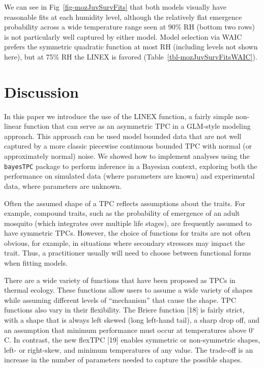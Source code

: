 \documentclass[
  11pt,
  letterpaper,
]{article}
\begin{document}
We can see in Fig~\ref{fig-mozJuvSurvFits} that both models visually
have reasonable fits at each humidity level, although the relatively
flat emergence probability across a wide temperature range seen at 90\%
RH (bottom two rows) is not particularly well captured by either model.
Model selection via WAIC prefers the symmetric quadratic function at
most RH (including levels not shown here), but at 75\% RH the LINEX is
favored (Table~\ref{tbl-mozJuvSurvFitsWAIC}).

\section{Discussion}\label{discussion}

In this paper we introduce the use of the LINEX function, a fairly
simple non-linear function that can serve as an asymmetric TPC in a
GLM-style modeling approach. This approach can be used model bounded
data that are not well captured by a more classic piecewise continuous
bounded TPC with normal (or approximately normal) noise. We showed how
to implement analyses using the \texttt{bayesTPC} package to perform
inference in a Bayesian context, exploring both the performance on
simulated data (where parameters are known) and experimental data, where
parameters are unknown.

Often the assumed shape of a TPC reflects assumptions about the traits.
For example, compound traits, such as the probability of emergence of an
adult mosquito (which integrates over multiple life stages), are
frequently assumed to have symmetric TPCs. However, the choice of
functions for traits are not often obvious, for example, in situations
where secondary stressors may impact the trait. Thus, a practitioner
usually will need to choose between functional forms when fitting
models.

There are a wide variety of functions that have been proposed as TPCs in
thermal ecology. These functions allow users to assume a wide variety of
shapes while assuming different levels of ``mechanism'' that cause the
shape. TPC functions also vary in their flexibility. The Briere function
{[}18{]} is fairly strict, with a shape that is always left skewed (long
left-hand tail), a sharp drop off, and an assumption that minimum
performance must occur at temperatures above 0\(^\circ\)C. In contrast,
the new flexTPC {[}19{]} enables symmetric or non-symmetric shapes,
left- or right-skew, and minimum temperatures of any value. The
trade-off is an increase in the number of parameters needed to capture
the possible shapes.
\end{document}

